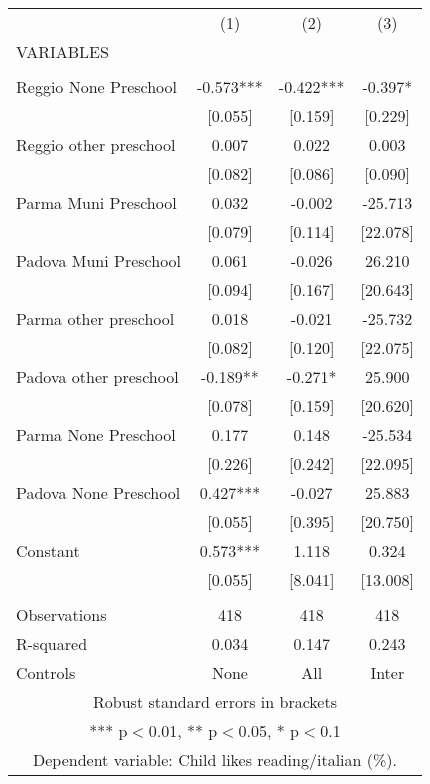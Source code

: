 \begin{tabular}{lccc} \hline
 & (1) & (2) & (3) \\
VARIABLES &  &  &  \\ \hline
 &  &  &  \\
Reggio None Preschool & -0.573*** & -0.422*** & -0.397* \\
 & [0.055] & [0.159] & [0.229] \\
Reggio other preschool & 0.007 & 0.022 & 0.003 \\
 & [0.082] & [0.086] & [0.090] \\
Parma Muni Preschool & 0.032 & -0.002 & -25.713 \\
 & [0.079] & [0.114] & [22.078] \\
Padova Muni Preschool & 0.061 & -0.026 & 26.210 \\
 & [0.094] & [0.167] & [20.643] \\
Parma other preschool & 0.018 & -0.021 & -25.732 \\
 & [0.082] & [0.120] & [22.075] \\
Padova other preschool & -0.189** & -0.271* & 25.900 \\
 & [0.078] & [0.159] & [20.620] \\
Parma None Preschool & 0.177 & 0.148 & -25.534 \\
 & [0.226] & [0.242] & [22.095] \\
Padova None Preschool & 0.427*** & -0.027 & 25.883 \\
 & [0.055] & [0.395] & [20.750] \\
Constant & 0.573*** & 1.118 & 0.324 \\
 & [0.055] & [8.041] & [13.008] \\
 &  &  &  \\
Observations & 418 & 418 & 418 \\
R-squared & 0.034 & 0.147 & 0.243 \\
 Controls & None & All & Inter \\ \hline
\multicolumn{4}{c}{ Robust standard errors in brackets} \\
\multicolumn{4}{c}{ *** p$<$0.01, ** p$<$0.05, * p$<$0.1} \\
\multicolumn{4}{c}{ Dependent variable: Child likes reading/italian (\%).} \\
\end{tabular}
